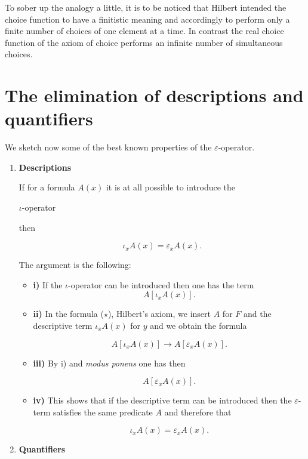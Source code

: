 \documentclass[12pt]{article}
\begin{document}
To sober up the analogy a little, it is to be noticed that Hilbert intended the choice function to have a finitistic meaning and accordingly to perform only a finite number of choices of one element at a time. In contrast the real choice function of the axiom of choice performs an infinite number of simultaneous choices. 

\section{The elimination of descriptions and quantifiers}\normalsize

We sketch now some of the best known properties of the $\varepsilon$-operator.

\begin{enumerate}
\item \textbf{Descriptions}

If for a formula $A (x)$ it is at all possible to introduce the 

\begin{center}
$\iota$-operator 
\end{center}

then

$$\iota_{x} A (x) = \varepsilon_{x} A (x).$$

The argument is the following:

\begin{itemize} 
\item \textbf{i)} If the $\iota$-operator can be introduced then one has the term
$$A [\iota_{x} A (x)].$$

\item \textbf{ii)} In the formula ($\star$), Hilbert's axiom, we insert $A$ for $F$ and the descriptive term $\iota_{x} A (x)$ for $y$ and we obtain the formula

$$A [\iota_{x} A (x)] \to A [\varepsilon_{x} A (x)].$$

\item \textbf{iii)} By i) and \emph{modus ponens} one has then
 
$$A [\varepsilon_{x} A (x)].$$

\item \textbf{iv)} This shows that if the descriptive term can be introduced then the $\varepsilon$-term satisfies the same predicate $A$ and therefore that

$$\iota_{x} A (x) = \varepsilon_{x} A (x).$$
\end{itemize}

\item \textbf{Quantifiers}


\end{enumerate}
\end{document}
